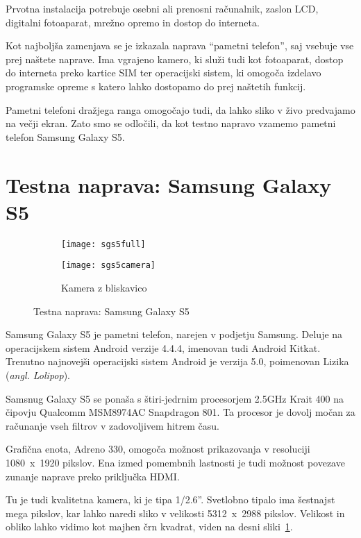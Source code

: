 Prvotna instalacija potrebuje osebni ali prenosni računalnik, zaslon LCD,
digitalni fotoaparat, mrežno opremo in dostop do interneta.

Kot najboljša zamenjava se je izkazala naprava ``pametni telefon'', saj
vsebuje vse prej naštete naprave. Ima vgrajeno kamero, ki služi tudi kot
fotoaparat, dostop do interneta preko kartice SIM ter operacijski sistem, ki
omogoča izdelavo programske opreme s katero lahko dostopamo do prej naštetih
funkcij.

Pametni telefoni dražjega ranga omogočajo tudi, da lahko sliko v živo
predvajamo na večji ekran. Zato smo se odločili, da kot testno napravo vzamemo
pametni telefon Samsung Galaxy S5.

\section{Testna naprava: Samsung Galaxy S5}

\begin{figure}[!ht]
    \centering
    \begin{subfigure}[b]{0.4\textwidth}
        \texttt{[image: sgs5full]}
    \end{subfigure}
    \begin{subfigure}[b]{0.4\textwidth}
        \texttt{[image: sgs5camera]}
        \caption{Kamera z bliskavico}
    \end{subfigure}
    \caption{Testna naprava: Samsung Galaxy S5}
    \label{fig:sgs5}
\end{figure}

Samsung Galaxy S5 je pametni telefon, narejen v podjetju Samsung. Deluje na
operacijskem sistem Android verzije 4.4.4, imenovan tudi Android Kitkat.
Trenutno najnovejši operacijski sistem Android je verzija 5.0, poimenovan
Lizika (\textit{angl. Lolipop}).

Samsnug Galaxy S5 se ponaša s štiri-jedrnim procesorjem 2.5GHz Krait 400 na
čipovju Qualcomm MSM8974AC Snapdragon 801. Ta procesor je dovolj močan za
računanje vseh filtrov v zadovoljivem hitrem času.

Grafična enota, Adreno 330, omogoča možnost prikazovanja v resoluciji
1080~x~1920 pikslov. Ena izmed pomembnih lastnosti je tudi možnost povezave
zunanje naprave preko priključka HDMI.

Tu je tudi kvalitetna kamera, ki je tipa 1/2.6''. Svetlobno tipalo ima
šestnajst mega pikslov, kar lahko naredi sliko v velikosti 5312~x~2988
pikslov. Velikost in obliko lahko vidimo kot majhen črn kvadrat, viden na
desni sliki~\ref{fig:sgs5}.


